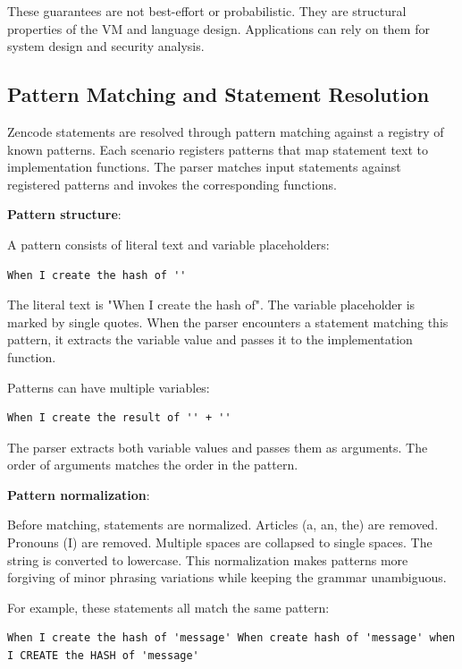 These guarantees are not best-effort or probabilistic. They are
structural properties of the VM and language design. Applications can
rely on them for system design and security analysis.

\subsection{Pattern Matching and Statement Resolution}

Zencode statements are resolved through pattern matching against a
registry of known patterns. Each scenario registers patterns that map
statement text to implementation functions. The parser matches input
statements against registered patterns and invokes the corresponding
functions.

\textbf{Pattern structure}:

A pattern consists of literal text and variable placeholders:

\begin{verbatim}
When I create the hash of ''
\end{verbatim}

The literal text is "When I create the hash of". The variable
placeholder is marked by single quotes. When the parser encounters a
statement matching this pattern, it extracts the variable value and
passes it to the implementation function.

Patterns can have multiple variables:

\begin{verbatim}
When I create the result of '' + ''
\end{verbatim}

The parser extracts both variable values and passes them as
arguments. The order of arguments matches the order in the pattern.

\textbf{Pattern normalization}:

Before matching, statements are normalized. Articles (a, an, the) are
removed. Pronouns (I) are removed. Multiple spaces are collapsed to
single spaces. The string is converted to lowercase. This
normalization makes patterns more forgiving of minor phrasing
variations while keeping the grammar unambiguous.

For example, these statements all match the same pattern:

\begin{verbatim}
When I create the hash of 'message' When create hash of 'message' when
I CREATE the HASH of 'message'
\end{verbatim}

